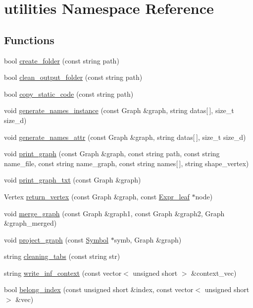 \hypertarget{namespaceutilities}{
\section{utilities Namespace Reference}
\label{namespaceutilities}
}
\subsection*{Functions}
\begin{CompactItemize}
\item 
bool \hyperlink{namespaceutilities_87fbb9605f1b59c54b95e708e1e9935b}{create\_\-folder} (const string path)
\item 
bool \hyperlink{namespaceutilities_28f2ace508b6ea5bc7af05b84f0b2487}{clean\_\-output\_\-folder} (const string path)
\item 
bool \hyperlink{namespaceutilities_931de9beaef867d11a8695efa2e13e56}{copy\_\-static\_\-code} (const string path)
\item 
void \hyperlink{namespaceutilities_0e49bfde1f01bb5567770fc492e6929f}{generate\_\-names\_\-instance} (const Graph \&graph, string datas\mbox{[}$\,$\mbox{]}, size\_\-t size\_\-d)
\item 
void \hyperlink{namespaceutilities_c88e50b1c88f16e0d052555d773b7be5}{generate\_\-names\_\-attr} (const Graph \&graph, string datas\mbox{[}$\,$\mbox{]}, size\_\-t size\_\-d)
\item 
void \hyperlink{namespaceutilities_e0c73d526799122fa0d85cd45b6d4fbb}{print\_\-graph} (const Graph \&graph, const string path, const string name\_\-file, const string name\_\-graph, const string names\mbox{[}$\,$\mbox{]}, string shape\_\-vertex)
\item 
void \hyperlink{namespaceutilities_bef7212b8948ccd35dcfa554508f9b1d}{print\_\-graph\_\-txt} (const Graph \&graph)
\item 
Vertex \hyperlink{namespaceutilities_13764073c6966781a6680ab58d88c1b5}{return\_\-vertex} (const Graph \&graph, const \hyperlink{classgenevalmag_1_1Expr__leaf}{Expr\_\-leaf} $\ast$node)
\item 
void \hyperlink{namespaceutilities_d0de56d624d099e4d9a5f605ca80b2e5}{merge\_\-graph} (const Graph \&graph1, const Graph \&graph2, Graph \&graph\_\-merged)
\item 
void \hyperlink{namespaceutilities_f78e9e1ebc91d6896a01f45d611cca0a}{project\_\-graph} (const \hyperlink{classgenevalmag_1_1Symbol}{Symbol} $\ast$symb, Graph \&graph)
\item 
string \hyperlink{namespaceutilities_644dfdb507e47adf60e6984d28e080fd}{cleaning\_\-tabs} (const string str)
\item 
string \hyperlink{namespaceutilities_21bbcd26f651d4ceb798b50af71c7b29}{write\_\-inf\_\-context} (const vector$<$ unsigned short $>$ \&context\_\-vec)
\item 
bool \hyperlink{namespaceutilities_a452cf7f1132b5d667bdeefffb33425f}{belong\_\-index} (const unsigned short \&index, const vector$<$ unsigned short $>$ \&vec)
\end{CompactItemize}


